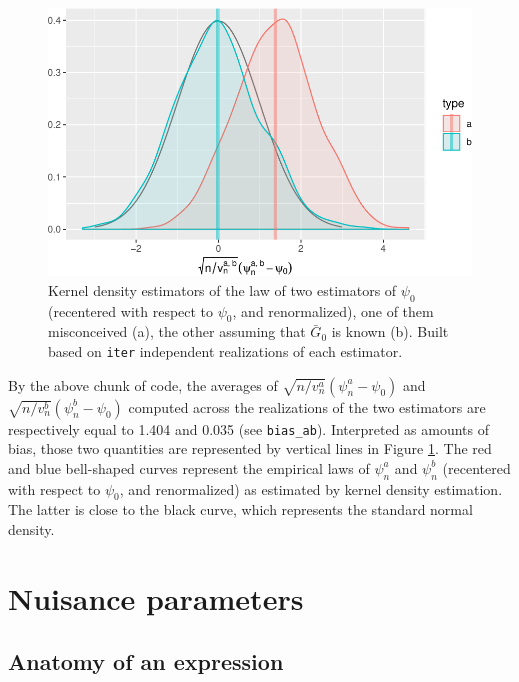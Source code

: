 \documentclass[11pt,openright,twoside]{book}
\newcommand{\Gbar}{\bar{G}}
\theoremstyle{definition}
\theoremstyle{definition}
\theoremstyle{definition}
\theoremstyle{remark}
\begin{document}
\begin{figure}

{\centering \includegraphics[width=0.7\linewidth]{img/known-Gbar-one-b-1} 

}

\caption{Kernel density estimators of the law of two estimators of \(\psi_{0}\) (recentered with respect to \(\psi_{0}\), and renormalized), one of them misconceived (a), the other assuming that \(\Gbar_{0}\) is known (b). Built based on \texttt{iter} independent realizations of each estimator.}\label{fig:known-Gbar-one-b}
\end{figure}

By the above chunk of code, the averages of \(\sqrt{n/v_{n}^{a}} (\psi_{n}^{a} - \psi_{0})\) and \(\sqrt{n/v_{n}^{b}} (\psi_{n}^{b} - \psi_{0})\)
computed across the realizations of the two estimators are respectively equal
to 1.404 and
0.035 (see \texttt{bias\_ab}). Interpreted as amounts of bias, those two
quantities are represented by vertical lines in Figure
\ref{fig:known-Gbar-one-b}. The red and blue bell-shaped curves represent the
empirical laws of \(\psi_{n}^{a}\) and \(\psi_{n}^{b}\) (recentered with respect
to \(\psi_{0}\), and renormalized) as estimated by kernel density estimation.
The latter is close to the black curve, which represents the standard normal
density.

\hypertarget{nuisance}{%
\chapter{Nuisance parameters}\label{nuisance}}

\hypertarget{anatomy}{%
\section{Anatomy of an expression}\label{anatomy}}

\end{document}
